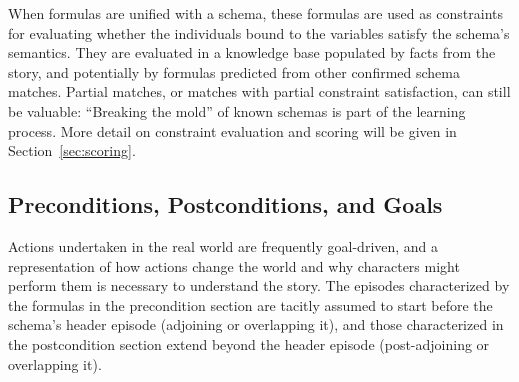 When formulas are unified with a schema, these formulas are used as constraints for evaluating whether the individuals bound to the variables satisfy the schema's semantics. They are evaluated in a knowledge base populated by facts from the story, and potentially by formulas predicted from other confirmed schema matches. Partial matches, or matches with partial constraint satisfaction, can still be valuable: ``Breaking the mold'' of known schemas is part of the learning process. More detail on constraint evaluation and scoring will be given in Section~\ref{sec:scoring}.

\subsection{Preconditions, Postconditions, and Goals}
Actions undertaken in the real world are frequently goal-driven, and a representation of how actions change the world and why characters might perform them is necessary to understand the story. The episodes characterized by the formulas in the precondition section are tacitly assumed to start before the schema's header episode (adjoining or overlapping it), and those characterized in the postcondition section extend beyond the header episode (post-adjoining or overlapping it).

